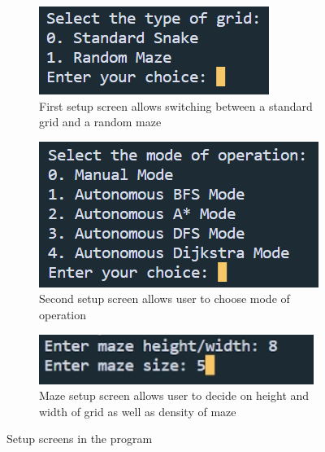 \documentclass[11pt]{article}
\begin{document}
\begin{figure}[H]
\centering

\begin{subfigure}{0.3\textwidth}
    \centering
    \includegraphics[scale=0.7]{Setup_1} 
    \caption{First setup screen allows switching between a standard grid and a random maze}
    \label{fig:subim1}
\end{subfigure}
\begin{subfigure}{0.3\textwidth}
    \centering
    \includegraphics[scale=0.7]{Setup_2}
    \caption{Second setup screen allows user to choose mode of operation}
    \label{fig:subim2}
\end{subfigure}
\begin{subfigure}{0.3\textwidth}
    \centering
    \includegraphics[scale=0.7]{Maze_Generation}
    \caption{Maze setup screen allows user to decide on height and width of grid as well as density of maze}
    \label{fig:subim3}
\end{subfigure}

\caption{Setup screens in the program}
\label{fig:image1}
\end{figure}
\end{document}
